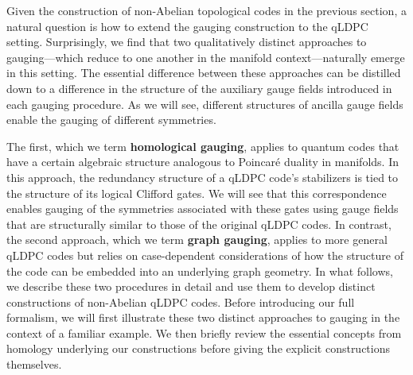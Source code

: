 \documentclass[aps,prx,reprint,superscriptaddress,nofootinbib]{revtex4-2}
\theoremstyle{definition}
\newcommand{\<}{\langle}
\renewcommand{\>}{\rangle}
\begin{document}
Given the construction of non-Abelian topological codes in the previous section, a natural question is how to extend the gauging construction to the qLDPC setting. 
%
Surprisingly, we find that two qualitatively distinct approaches to gauging---which reduce to one another in the manifold context---naturally emerge in this setting.
%
The essential difference between these approaches can be distilled down to a difference in the structure of the auxiliary gauge fields introduced in each gauging procedure. As  we will see, different structures of ancilla gauge fields enable the gauging of different symmetries.

%
The first, which we term \textbf{homological gauging}, applies to quantum codes that have a certain algebraic structure analogous to Poincar\'e duality in manifolds.
%
In this approach, the redundancy structure of a qLDPC code's stabilizers is tied to the structure of its logical Clifford gates. 
%
We will see that this correspondence enables gauging of the symmetries associated with these gates using gauge fields that are structurally similar to those of the original qLDPC codes.
%
In contrast, the second approach, which we term \textbf{graph gauging}, applies to more general qLDPC codes but relies on case-dependent considerations of how the structure of the code can be embedded into an underlying graph geometry.
%
In what follows, we describe these two procedures in detail and use them to develop distinct constructions of non-Abelian qLDPC codes.
%
Before introducing our full formalism, we will first illustrate these two distinct approaches to gauging in the context of a familiar example. We then briefly review the essential concepts from homology underlying our constructions before giving the explicit constructions themselves.
\end{document}
